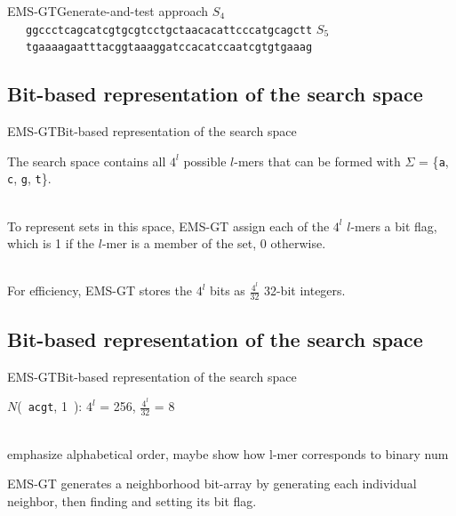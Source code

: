 \documentclass[pdf,xcolor={dvipsnames}]{beamer}
\begin{document}
\begin{frame}{EMS-GT}{Generate-and-test approach}
{			$S_4$\ \ \  \texttt{ggccctca{{g}catcgt{g}}cgtcctgctaacacattcccatgcagctt}\newline\newline\newline
			$S_5$\ \ \  \texttt{tgaaaagaatttacggtaaaggatccacatc{c{a}atcgt{g}}tgaaag}\newline\newline\newline
		 }
		\end{frame}

	\subsection{Bit-based representation of the search space}
	\begin{frame}{EMS-GT}{Bit-based representation of the search space}
		\begin{itemize}
		{
			\item The search space contains all $4^l$ possible $l$-mers that can be formed with
			$\Sigma$ = \{\texttt{a}, \texttt{c}, \texttt{g}, \texttt{t}\}. \\\ \\
			\item To represent sets in this space, EMS-GT assign each of the $4^l$ $l$-mers a bit flag,
			which is 1 if the $l$-mer is a member of the set, 0 otherwise.\\\ \\
			\item For efficiency, EMS-GT stores the $4^l$ bits as $\frac{4^l}{32}$ 32-bit integers.
		}
		\end{itemize}
		\end{frame}

	\subsection{Bit-based representation of the search space}
	\begin{frame}{EMS-GT}{Bit-based representation of the search space}
		\begin{itemize}
		{
			\item $N$(\ \texttt{acgt}, 1\ ): $4^l$ = 256, $\frac{4^l}{32}$ = 8
			
			\ \\ {\color{red}emphasize alphabetical order, maybe show how l-mer corresponds to binary num}  \\
			\item EMS-GT generates a neighborhood bit-array by generating each individual neighbor, then finding and setting its bit flag.
		}
		\end{itemize}
		\end{frame}
\end{document}
